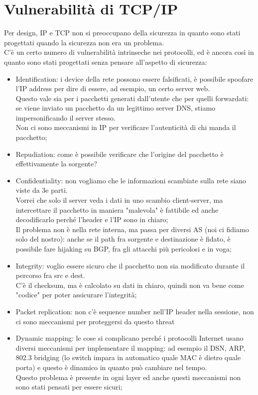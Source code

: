 \documentclass[12pt, oneside]{extbook} %
\begin{document}
\section{Vulnerabilità di TCP/IP}
Per design, IP e TCP non si preoccupano della sicurezza in quanto sono stati progettati quando la sicurezza non era un problema.
\\C'è un certo numero di vulnerabilità intrinseche nei protocolli, ed è ancora così in quanto sono stati progettati senza pensare all'aspetto di sicurezza:
\begin{itemize}
    \item Identification: i device della rete possono essere falsificati, è possibile spoofare l'IP address per dire di essere, ad esempio, un certo server web.
    \\Questo vale sia per i pacchetti generati dall'utente che per quelli forwardati: se viene inviato un pacchetto da un legittimo server DNS, stiamo impersonificando il server stesso.
    \\Non ci sono meccanismi in IP per verificare l'autenticità di chi manda il pacchetto;
    \item Repudiation: come è possibile verificare che l'origine del pacchetto è effettivamente la sorgente?
    \item Confidentiality: non vogliamo che le informazioni scambiate sulla rete siano viste da 3e parti.
    \\Vorrei che solo il server veda i dati in uno scambio client-server, ma intercettare il pacchetto in maniera "malevola" è fattibile ed anche decodificarlo perché l'header e l'IP sono in chiaro;
    \\Il problema non è nella rete interna, ma passa per diversi AS (noi ci fidiamo solo del nostro): anche se il path fra sorgente e destinazione è fidato, è possibile fare hijaking su BGP, fra gli attacchi più pericolosi e in voga;
    \item Integrity: voglio essere sicuro che il pacchetto non sia modificato durante il percorso fra src e dest.
    \\C'è il checksum, ma è calcolato su dati in chiaro, quindi non va bene come "codice" per poter assicurare l'integrità;
    \item Packet replication: non c'è sequence number nell'IP header nella sessione, non ci sono meccanismi per proteggersi da questo threat
    \item Dynamic mapping: le cose si complicano perché i protocolli Internet usano diversi meccanismi per implementare il mapping: ad esempio il DSN, ARP, 802.3 bridging (lo switch impara in automatico quale MAC è dietro quale porta) e questo è dinamico in quanto può cambiare nel tempo.
\\Questo problema è presente in ogni layer ed anche questi meccanismi non sono stati pensati per essere sicuri;
\end{itemize}
\end{document}

